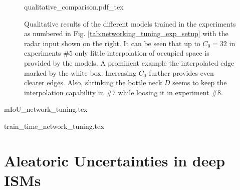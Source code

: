 \begin{figure}[H]
	\begin{center}
		{qualitative_comparison.pdf_tex}
		\caption{\label{fig:gt_exp_qual_results}Qualitative results of the different models trained in the experiments as numbered in Fig. \ref{tab:networking_tuning_exp_setup} with the radar input shown on the right. It can be seen that up to $C_0=32$ in experiments $\#5$ only little interpolation of occupied space is provided by the models. A prominent example the interpolated edge marked by the white box. Increasing $C_0$ further provides even clearer edges. Also, shrinking the bottle neck $D$ seems to keep the interpolation capability in $\#7$ while loosing it in experiment $\#8$.}
	\end{center}
\end{figure}
\begin{center}
\begin{minipage}{.5\textwidth}
	{mIoU_network_tuning.tex}
\end{minipage}
%
\hfill
\begin{minipage}{.47\textwidth}
	{train_time_network_tuning.tex} 
\end{minipage}
\end{center}
%
\section{Aleatoric Uncertainties in deep ISMs}
\label{sec:al_uncert_in_deep_isms}
%
